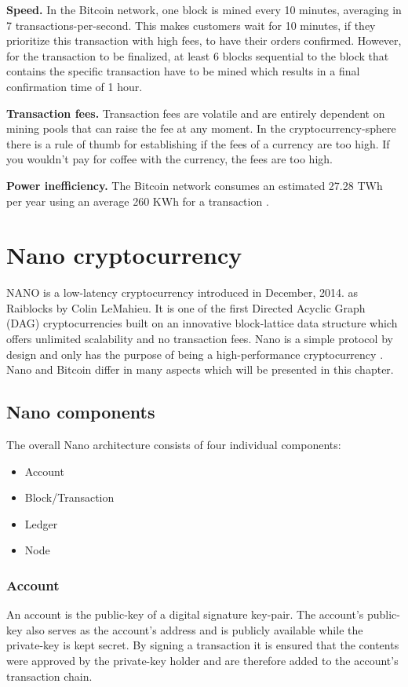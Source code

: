 \documentclass{ferseminar}
\begin{document}
\textbf{Speed.} In the Bitcoin network, one block is mined every 10 minutes, averaging in 7 transactions-per-second. This makes customers wait for 10 minutes, if they prioritize this transaction with high fees, to have their orders confirmed. However, for the transaction to be finalized, at least 6 blocks sequential to the block that contains the specific transaction have to be mined which results in a final confirmation time of 1 hour.

\textbf{Transaction fees.} Transaction fees are volatile and are entirely dependent on mining pools that can raise the fee at any moment. In the cryptocurrency-sphere there is a rule of thumb for establishing if the fees of a currency are too high. If you wouldn't pay for coffee with the currency, the fees are too high.

\textbf{Power inefficiency.} The Bitcoin network consumes an estimated 27.28 TWh per year using an average 260 KWh for a transaction \cite{Nano}.

\section{Nano cryptocurrency}

NANO is a low-latency cryptocurrency introduced in December, 2014. as Raiblocks by Colin LeMahieu. It is one of the first Directed Acyclic Graph (DAG) cryptocurrencies built on an innovative block-lattice data structure which offers unlimited scalability and no transaction fees. Nano is a simple protocol by design and only has the purpose of being a high-performance cryptocurrency \cite{Nano}. Nano and Bitcoin differ in many aspects which will be presented in this chapter.

\subsection{Nano components}
The overall Nano architecture consists of four individual components:
\begin{itemize}
	\item Account
	\item Block/Transaction
	\item Ledger
	\item Node
\end{itemize}

\subsubsection{Account}
An account is the public-key of a digital signature key-pair. The account's public-key also serves as the account's address and is publicly available while the private-key is kept secret. By signing a transaction it is ensured that the contents were approved by the private-key holder and are therefore added to the account's transaction chain. 
\end{document}
